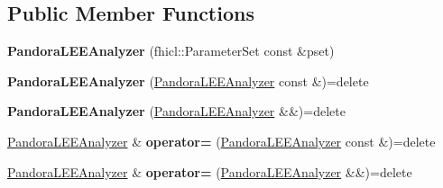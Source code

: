 \subsection*{Public Member Functions}
\begin{DoxyCompactItemize}
\item 
\hypertarget{group__lee_ga3783391baff0585de9261a559a8d28ef}{{\bfseries Pandora\-L\-E\-E\-Analyzer} (fhicl\-::\-Parameter\-Set const \&pset)}\label{group__lee_ga3783391baff0585de9261a559a8d28ef}

\item 
\hypertarget{group__lee_ga50f8e3ecdc7892d554c68080645af88c}{{\bfseries Pandora\-L\-E\-E\-Analyzer} (\hyperlink{classlee_1_1PandoraLEEAnalyzer}{Pandora\-L\-E\-E\-Analyzer} const \&)=delete}\label{group__lee_ga50f8e3ecdc7892d554c68080645af88c}

\item 
\hypertarget{group__lee_ga8e9dc3f96fcb2881bee2bfb46dcedaaf}{{\bfseries Pandora\-L\-E\-E\-Analyzer} (\hyperlink{classlee_1_1PandoraLEEAnalyzer}{Pandora\-L\-E\-E\-Analyzer} \&\&)=delete}\label{group__lee_ga8e9dc3f96fcb2881bee2bfb46dcedaaf}

\item 
\hypertarget{group__lee_gae71d8ba45ecaaa09a587ecf3cd693675}{\hyperlink{classlee_1_1PandoraLEEAnalyzer}{Pandora\-L\-E\-E\-Analyzer} \& {\bfseries operator=} (\hyperlink{classlee_1_1PandoraLEEAnalyzer}{Pandora\-L\-E\-E\-Analyzer} const \&)=delete}\label{group__lee_gae71d8ba45ecaaa09a587ecf3cd693675}

\item 
\hypertarget{group__lee_ga79984f454c76dbb927254731d85e40c4}{\hyperlink{classlee_1_1PandoraLEEAnalyzer}{Pandora\-L\-E\-E\-Analyzer} \& {\bfseries operator=} (\hyperlink{classlee_1_1PandoraLEEAnalyzer}{Pandora\-L\-E\-E\-Analyzer} \&\&)=delete}\label{group__lee_ga79984f454c76dbb927254731d85e40c4}


\end{DoxyCompactItemize}
